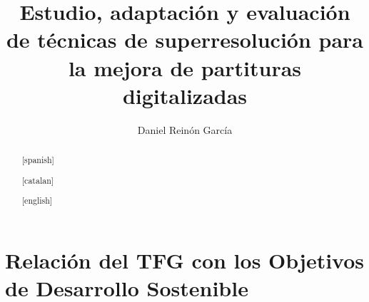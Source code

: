 \documentclass[11pt,spanish,listoffigures,listoftables]{tfgetsinf}
\title{Estudio, adaptación y evaluación de técnicas de superresolución para la mejora de partituras digitalizadas}
\author{Daniel Reinón García}
\begin{document}


\begin{abstract}[spanish]

\end{abstract}

\clearpage
\begin{abstract}[catalan]

\end{abstract}

\clearpage
\begin{abstract}[english]

\end{abstract}



\mainmatter













\cleardoublepage

\APPENDIX




\chapter{Relación del TFG con los Objetivos de Desarrollo Sostenible}

\end{document}
